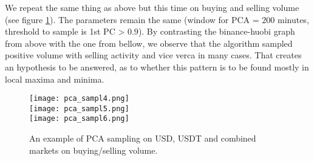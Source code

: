 We repeat the same thing as above but this time on buying and selling volume (see figure \ref{fig:pca_sampl2}). The parameters remain the same (window for PCA = \(200\) minutes, threshold to sample is 1st PC > \(0.9\)). By contrasting the binance-huobi graph from above with the one from bellow, we observe that the algorithm sampled positive volume with selling activity and vice verca in many cases. That creates an hypothesis to be answered, as to whether this pattern is to be found mostly in local maxima and minima.



\begin{figure}[H]
	\centering
    \texttt{[image: pca\_sampl4.png]} \\
    \texttt{[image: pca\_sampl5.png]} \\
    \texttt{[image: pca\_sampl6.png]}
	\caption{An example of PCA sampling on USD, USDT and combined markets on buying/selling volume.}
    \label{fig:pca_sampl2}
\end{figure}


